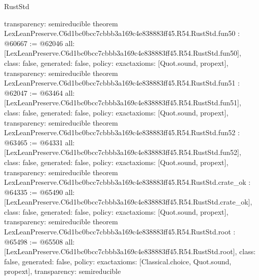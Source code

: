 \begin{lexlean}{RustStd}
\begin{coremodule}
{  transparency: semireducible
}
theorem LexLeanPreserve.C6d1bc0bcc7cbbb3a169c4e838883ff45.R54.RustStd.fun50 : @60667 := @62046 {
  all: [LexLeanPreserve.C6d1bc0bcc7cbbb3a169c4e838883ff45.R54.RustStd.fun50],
  class: false,
  generated: false,
  policy: exact{axioms: [Quot.sound, propext]},
  transparency: semireducible
}
theorem LexLeanPreserve.C6d1bc0bcc7cbbb3a169c4e838883ff45.R54.RustStd.fun51 : @62047 := @63464 {
  all: [LexLeanPreserve.C6d1bc0bcc7cbbb3a169c4e838883ff45.R54.RustStd.fun51],
  class: false,
  generated: false,
  policy: exact{axioms: [Quot.sound, propext]},
  transparency: semireducible
}
theorem LexLeanPreserve.C6d1bc0bcc7cbbb3a169c4e838883ff45.R54.RustStd.fun52 : @63465 := @64331 {
  all: [LexLeanPreserve.C6d1bc0bcc7cbbb3a169c4e838883ff45.R54.RustStd.fun52],
  class: false,
  generated: false,
  policy: exact{axioms: [Quot.sound, propext]},
  transparency: semireducible
}
theorem LexLeanPreserve.C6d1bc0bcc7cbbb3a169c4e838883ff45.R54.RustStd.crate_ok : @64335 := @65490 {
  all: [LexLeanPreserve.C6d1bc0bcc7cbbb3a169c4e838883ff45.R54.RustStd.crate_ok],
  class: false,
  generated: false,
  policy: exact{axioms: [Quot.sound, propext]},
  transparency: semireducible
}
theorem LexLeanPreserve.C6d1bc0bcc7cbbb3a169c4e838883ff45.R54.RustStd.root : @65498 := @65508 {
  all: [LexLeanPreserve.C6d1bc0bcc7cbbb3a169c4e838883ff45.R54.RustStd.root],
  class: false,
  generated: false,
  policy: exact{axioms: [Classical.choice, Quot.sound, propext]},
  transparency: semireducible
}


\end{coremodule}
\end{lexlean}

